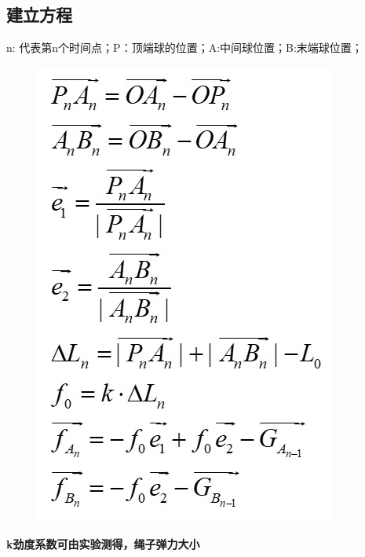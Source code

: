 \documentclass[12pt,a4paper]{ctexart}
\begin{document}
	\subsection{建立方程}
	n: 代表第n个时间点；P：顶端球的位置；A:中间球位置；B:末端球位置；
	\noindent\textbf{}
	
			\begin{figure}[h] %
		\centering %
		\includegraphics[scale=0.6]{T53.jpg} %
	\end{figure}%
	\noindent\textbf{k劲度系数可由实验测得，绳子弹力大小}\\\
	\clearpage
	\thispagestyle{empty}
	
\end{document}
